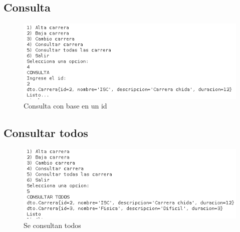 \documentclass[a4paper,12pt]{article}
\begin{document}
\subsection{Consulta}
\begin{figure}[H]
\begin{center}
 \includegraphics[width=\textwidth]{consulta.png}
 \caption{Consulta con base en un id}
 \label{fig:consulta}
\end{center}
\end{figure}

\subsection{Consultar todos}
\begin{figure}[H]
\begin{center}
 \includegraphics[width=\textwidth]{todos.png}
 \caption{Se consultan todos}
 \label{fig:todos}
\end{center}
\end{figure}
\end{document}
